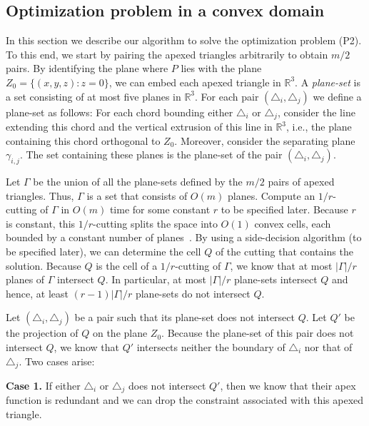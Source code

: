 \documentclass[a4paper,UKenglish]{lipics}
\begin{document}
\subsection{Optimization problem in a convex domain}
In this section we describe our algorithm to solve the optimization problem (P2). 
To this end, we start by pairing the apexed triangles arbitrarily to obtain $m/2$ pairs.
By identifying the plane where $P$ lies with the plane $Z_0 = \{(x,y,z): z = 0\}$, we can embed each apexed triangle in $\mathbb{R}^3$.
A \emph{plane-set} is a set consisting of at most five planes in $\mathbb{R}^3$.
For each pair $(\triangle_i, \triangle_j)$ we define a plane-set as follows: 
For each chord bounding either $\triangle_i$ or $\triangle_j$, consider the line extending this chord and the vertical extrusion of this line in $\mathbb{R}^3$, i.e.,  the plane containing this chord orthogonal to $Z_0$. Moreover, consider the separating plane~$\gamma_{i,j}$. The set containing these planes is the plane-set of the pair $(\triangle_i, \triangle_j)$.

Let $\Gamma$ be the union of all the plane-sets defined by the $m/2$ pairs of apexed triangles. Thus, $\Gamma$ is a set that consists of $O(m)$ planes. Compute an $1/r$-cutting of $\Gamma$ in $O(m)$ time for some constant $r$ to be specified later.
Because $r$ is constant, this $1/r$-cutting splits the space into $O(1)$ convex cells, each bounded by a constant number of planes~\cite{matousekCuttings}. 
By using a side-decision algorithm (to be specified later), we can determine the cell $Q$ of the cutting that contains the solution. Because $Q$ is the cell of a $1/r$-cutting of $\Gamma$, we know that at most $|\Gamma|/r$ planes of $\Gamma$ intersect $Q$. In particular, at most $|\Gamma|/r$ plane-sets intersect $Q$ and hence, at least $(r-1)|\Gamma|/r$ plane-sets do not intersect $Q$. 

Let $(\triangle_i, \triangle_j)$ be a pair such that its plane-set does not intersect $Q$. 
Let $Q'$ be the projection of $Q$ on the plane $Z_0$. Because the plane-set of this pair does not intersect $Q$, we know that $Q'$ intersects neither the boundary of $\triangle_i$ nor that of $\triangle_j$.
Two cases arise:

\textbf{Case 1.} If either $\triangle_i$ or $\triangle_j$ does not intersect $Q'$, then we know that their apex function is redundant and we can drop the constraint associated with this apexed triangle.
\end{document}
